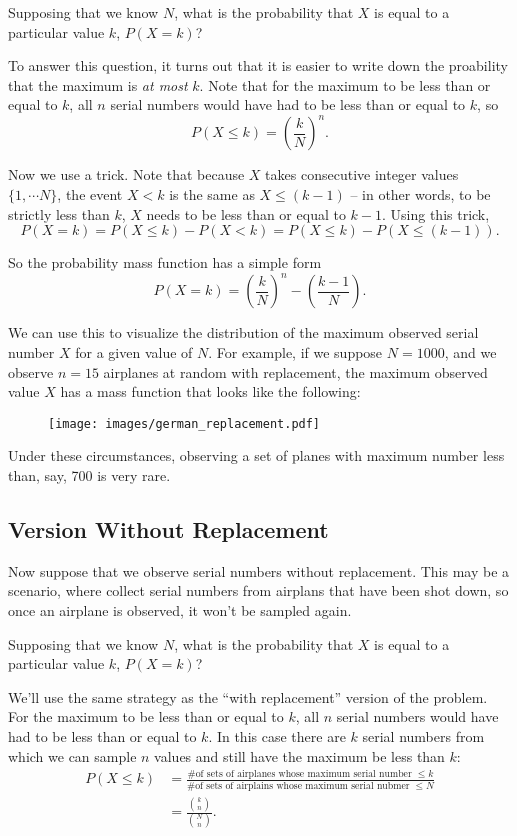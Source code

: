 \documentclass[11pt]{article}
\begin{document}
Supposing that we know $N$, what is the probability that $X$ is equal to a particular value $k$, $P(X = k)$?

To answer this question, it turns out that it is easier to write down the proability that the maximum is \emph{at most} $k$.
Note that for the maximum to be less than or equal to $k$, all $n$ serial numbers would have had to be less than or equal to $k$,
so
$$
P(X \leq k) = \left(\frac{k}{N}\right)^n.
$$

Now we use a trick. Note that because $X$ takes consecutive integer values $\{1, \cdots N\}$, the event $X < k$ is the same as
$X \leq (k-1)$ -- in other words, to be strictly less than $k$, $X$ needs to be less than or equal to $k-1$. Using this trick,
$$
P(X = k) = P(X \leq k) - P(X < k) = P(X \leq k) - P(X \leq (k-1)).
$$

So the probability mass function has a simple form
$$
P(X = k) = \left(\frac{k}{N}\right)^n - \left(\frac{k-1}{N}\right).
$$

We can use this to visualize the distribution of the maximum observed serial number $X$ for a given value of $N$. For example,
if we suppose $N = 1000$, and we observe $n = 15$ airplanes at random with replacement, the maximum observed value $X$ has a
mass function that looks like the following:

\begin{figure}[h!]
    \centering
    \texttt{[image: images/german\_replacement.pdf]}
\end{figure}

Under these circumstances, observing a set of planes with maximum number less than, say, 700 is very rare.

\subsection*{Version Without Replacement}
Now suppose that we observe serial numbers without replacement. This may be a scenario,
where collect serial numbers from airplans that have been shot down, so once an airplane is observed,
it won't be sampled again.

Supposing that we know $N$, what is the probability that $X$ is equal to a particular value $k$, $P(X = k)$?

We'll use the same strategy as the ``with replacement'' version of the problem.
For the maximum to be less than or equal to $k$, all $n$ serial numbers would have had to be less than or equal to $k$.
In this case there are $k$ serial numbers from which we can sample $n$ values and still have the maximum be less than $k$:
\begin{align*}
    P(X \leq k) &= \frac{\textrm{\# of sets of airplanes whose maximum serial number $\leq k$}}{\textrm{\# of sets of airplains whose maximum serial nubmer $\leq N$}}\\
                &= \frac{{k \choose n}}{{N \choose n}}
.
\end{align*}
\end{document}
